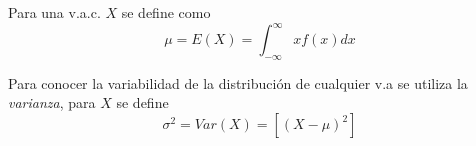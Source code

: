 Para una v.a.c. $X$ se define como
\begin{equation}
\mu=E(X)=\int_{-\infty}^{\infty}xf(x)dx
\end{equation}

Para conocer la variabilidad de la distribución de cualquier v.a se utiliza la \emph{varianza}, para $X$ se define
\begin{equation}
\sigma^2=Var(X)=[{(X-\mu)}^2]
\end{equation}

